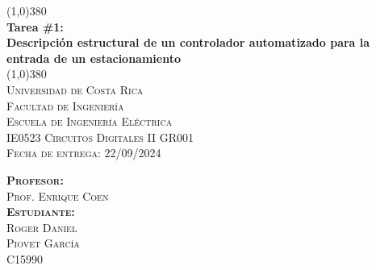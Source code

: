 \begin{titlepage}    
    \begin{center}
        \line(1,0){380}\\
        [5mm]
        \huge{\bfseries 
            Tarea \#1:\\ 
            Descripción estructural de un controlador 
            automatizado para la entrada de un estacionamiento}\\
        \line(1,0){380}\\
        [1.5cm]
        \textsc{\Large 
            Universidad de Costa Rica\\
            Facultad de Ingeniería\\
            Escuela de Ingeniería Eléctrica\\
            IE0523 Circuitos Digitales II GR001\\ \vspace{-0.25cm}
            Fecha de entrega: 22/09/2024}
        \vspace{1.0cm}
        \begin{flushleft}
            \textsc{\large
                \textbf{Profesor:}\\ 
                Prof. Enrique Coen\\[5mm]
                \textbf{Estudiante:}\\ 
                Roger Daniel\\
                Piovet García\\[2mm]
                C15990\\}
        \end{flushleft}
    \end{center}
\end{titlepage}
\restoregeometry

